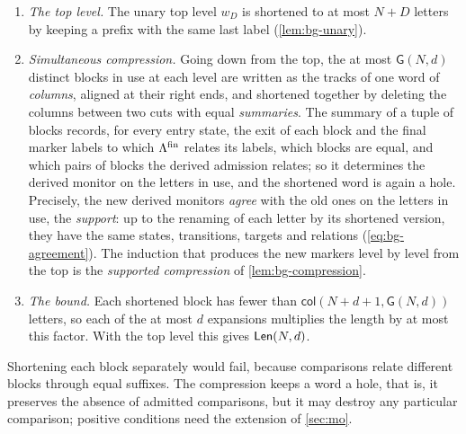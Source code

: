 \begin{enumerate}[leftmargin=*]
\begin{description}[leftmargin=1em,font=\normalfont\itshape]
    $\Lambda_i$ and $\Lfin_i$ when it is compared with itself (the \emph{self
    table}), with a protected letter (the \emph{protected rows}), and with the
    start label (the \emph{initial row}).
  \end{description}
\item \emph{The top level.} The unary top level $w_D$ is shortened to at most
  $N+D$ letters by keeping a prefix with the same last label
  (\cref{lem:bg-unary}).
\item \emph{Simultaneous compression.} Going down from the top, the at most
  $\mathsf G(N,d)$ distinct blocks in use at each level are written as the
  tracks of one word of \emph{columns}, aligned at their right ends, and
  shortened together by deleting the columns between two cuts with equal
  \emph{summaries}. The summary of a tuple of blocks records, for every entry
  state, the exit of each block and the final marker labels to which $\Lambda^{\mathrm{fin}}$
  relates its labels, which blocks are equal, and which pairs of blocks the
  derived admission relates; so it determines the derived monitor on the letters in use, and the
  shortened word is again a hole. Precisely, the new derived monitors
  \emph{agree} with the old ones on the letters in use, the \emph{support}: up
  to the renaming of each letter by its shortened version, they have the same
  states, transitions, targets and relations (\cref{eq:bg-agreement}). The
  induction that produces the new markers level by level from the top is the
  \emph{supported compression} of \cref{lem:bg-compression}.
\item \emph{The bound.} Each shortened block has fewer than
  $\mathsf{col}(N+d+1,\mathsf G(N,d))$ letters, so each of the at most $d$
  expansions multiplies the length by at most this factor. With the top level
  this gives $\mathsf{Len}(N,d)$.
\end{enumerate}
Shortening each block separately would fail, because comparisons relate
different blocks through equal suffixes. The compression keeps a word a hole,
that is, it preserves the absence of admitted comparisons, but it may destroy
any particular comparison; positive conditions need the extension of
\cref{sec:mo}.

